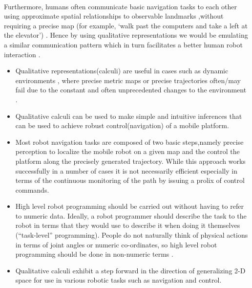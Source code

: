 \paragraph{} Furthermore, humans often communicate basic navigation tasks to each other using approximate spatial relationships to observable landmarks \cite{michon2001and} \cite{chen2015survey} ,without requiring a precise map (for example, ‘walk past the computers and take a left at the elevator’) \cite{shah2013qualitative}. Hence by using qualitative representations we would be emulating a similar communication pattern which in turn facilitates a better human robot interaction \cite{dondrup2015computational}. 

\begin{itemize}   
	
	\item Qualitative representations(calculi) are useful in cases such as dynamic environments \cite{fraser2004application}, where precise metric maps or precise trajectories often/may fail due to the constant and often unprecedented changes to the environment \cite{shah2013qualitative}.
	
	\item Qualitative calculi can be used to make simple and intuitive inferences that can be used to achieve robust control(navigation) \cite{cohn2008qualitative} \cite{kuipers1991robot} of a mobile platform.
	
	\newpage
	
	\item Most robot navigation tasks are composed of two basic steps,namely precise perception to localize the mobile robot on a given map and the control the platform along the precisely generated trajectory. While this approach works successfully in a number of cases it is not necessarily efficient \cite{mcclelland2016qualitative} especially in terms of the continuous monitoring of the path by issuing a prolix of control commands.
	
	\item High level robot programming should be carried out without having to refer to numeric data. Ideally, a robot programmer should describe the task to the robot in terms that they would use to describe it when doing it themselves (``task-level'' programming). People do not naturally think of physical actions in terms of joint angles or numeric co-ordinates, so high level robot programming should be done in non-numeric terms \cite{blackwell1988spatial}.
	
	\item Qualitative calculi exhibit a step forward in the direction of generalizing 2-D space \cite{blackwell1988spatial} for use in various robotic tasks such as navigation \cite{mcclelland2016qualitative} \cite{cohn2008qualitative} and control.
\end{itemize}


